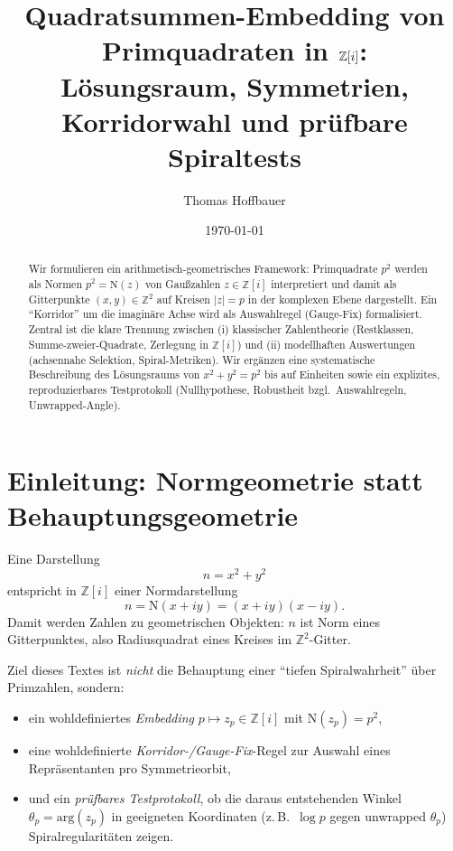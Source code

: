 \documentclass[a4paper,11pt]{article}
\title{\textbf{Quadratsummen-Embedding von Primquadraten in \(\Zi\):\\
		Lösungsraum, Symmetrien, Korridorwahl und prüfbare Spiraltests}}
\author{Thomas Hoffbauer}
\date{\today}
\theoremstyle{definition}
\theoremstyle{remark}
\newcommand{\Z}{\mathbb{Z}}
\newcommand{\Zi}{\mathbb{Z}[i]}
\newcommand{\Norm}{\mathrm{N}}
\newcommand{\Arg}{\mathrm{arg}}
\begin{document}
	\maketitle
	
	\begin{abstract}
		Wir formulieren ein arithmetisch-geometrisches Framework: Primquadrate \(p^2\) werden als Normen
		\(p^2=\Norm(z)\) von Gaußzahlen \(z\in\Zi\) interpretiert und damit als Gitterpunkte \((x,y)\in\Z^2\) auf Kreisen
		\(|z|=p\) in der komplexen Ebene dargestellt. Ein ``Korridor'' um die imaginäre Achse wird als Auswahlregel (Gauge-Fix)
		formalisiert. Zentral ist die klare Trennung zwischen (i) klassischer Zahlentheorie (Restklassen, Summe-zweier-Quadrate,
		Zerlegung in \(\Zi\)) und (ii) modellhaften Auswertungen (achsennahe Selektion, Spiral-Metriken). Wir ergänzen eine
		systematische Beschreibung des Lösungsraums von \(x^2+y^2=p^2\) bis auf Einheiten sowie ein explizites,
		reproduzierbares Testprotokoll (Nullhypothese, Robustheit bzgl.\ Auswahlregeln, Unwrapped-Angle).
	\end{abstract}
	
	\tableofcontents
	
	\section{Einleitung: Normgeometrie statt Behauptungsgeometrie}
	Eine Darstellung
	\[
	n=x^2+y^2
	\]
	entspricht in \(\Zi\) einer Normdarstellung
	\[
	n=\Norm(x+iy)=(x+iy)(x-iy).
	\]
	Damit werden Zahlen zu geometrischen Objekten: \(n\) ist Norm eines Gitterpunktes, also Radiusquadrat eines Kreises
	im \(\Z^2\)-Gitter.
	
	Ziel dieses Textes ist \emph{nicht} die Behauptung einer ``tiefen Spiralwahrheit'' über Primzahlen, sondern:
	\begin{itemize}
		\item ein wohldefiniertes \emph{Embedding} \(p\mapsto z_p\in\Zi\) mit \(\Norm(z_p)=p^2\),
		\item eine wohldefinierte \emph{Korridor-/Gauge-Fix}-Regel zur Auswahl eines Repräsentanten pro Symmetrieorbit,
		\item und ein \emph{prüfbares Testprotokoll}, ob die daraus entstehenden Winkel \(\theta_p=\Arg(z_p)\) in geeigneten
		Koordinaten (z.\,B.\ \(\log p\) gegen unwrapped \(\theta_p\)) Spiralregularitäten zeigen.
	\end{itemize}
	
\end{document}
